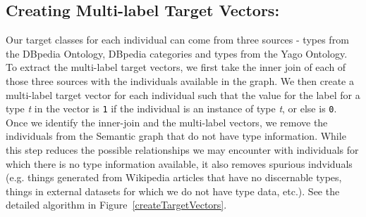 \documentclass[runningheads,a4paper]{llncs}
\begin{document}
\subsection{Creating Multi-label Target Vectors:}
\label{targetVector}
Our target classes for each individual can come from three sources - types from the DBpedia Ontology, DBpedia categories
and types from the Yago \cite{suchanek2007yago} Ontology. To extract the multi-label target vectors, we first take the inner join of each of those three sources with the individuals available in the graph. We then create a multi-label target vector for each individual such that the value for the label for a type \textit{t} in the vector is \texttt{1} if the individual is an instance of type \textit{t}, or else is \texttt{0}.
Once we identify the inner-join and the multi-label vectors, we remove the individuals from the Semantic graph that do not have type information. While this step reduces the possible relationships we may encounter with individuals for which there is no type information available, it also removes spurious indviduals (e.g. things generated from Wikipedia articles that have no discernable types, things in external datasets for which we do not have type data, etc.). See the detailed algorithm in Figure~\ref{createTargetVectors}.
\end{document}
